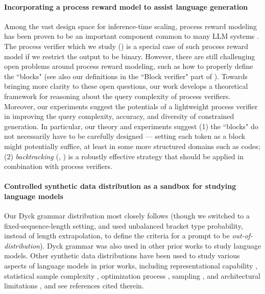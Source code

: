 \paragraph{Incorporating a process reward model to assist language generation}
Among the vast design space for inference-time scaling,
process reward modeling has been proven to be an important component common to many LLM systems
\citep{polu2020generative,uesato2022solving,ma2023let,lightman2023let,wang2024math}.
The process verifier which we study () is a special case of such process reward model if we restrict the output to be binary.
However, there are still challenging open problems around process reward modeling,
such as how to properly define the ``blocks"
\citep{guo2025deepseek}
(see also our definitions in the ``Block verifier" part of ).
Towards bringing more clarity to these open questions,
our work develops a theoretical framework for reasoning about the query complexity of process verifiers.
Moreover, our experiments suggest the potentials of a lightweight process verifier in improving the query complexity, accuracy, and diversity of constrained generation.
In particular, our theory and experiments suggest
(1) the ``blocks" do not necessarily have to be carefully designed --- setting each token as a block might potentially suffice, at least in some more structured domains such as codes;
(2) \emph{backtracking} (, ) is a robustly effective strategy that should be applied in combination with process verifiers.




\paragraph{Controlled synthetic data distribution as a sandbox for studying language models}
Our Dyck grammar distribution most closely follows \citet{wen2023uninterpretability} 
(though we switched to a fixed-sequence-length setting, and used unbalanced bracket type probability, instead of length extrapolation, to define the criteria for a prompt to be \emph{out-of-distribution}).
Dyck grammar was also used in other prior works \citep{hewitt2020rnns, ebrahimi2020self, yao2021self, liu2023same, liu2023Transformers} to study language models.
Other synthetic data distributions have been used to study various aspects of language models in prior works, including
representational capability \citep{bhattamishra2020ability, li2021limitations, zhang2022unveiling, zhao2023Transformers}, 
statistical sample complexity \citep{edelman2022inductive},
optimization process \citep{lu2021on, jelassi2022vision,li2023Transformers,bietti2023birth},
sampling \citep{li2024promises},
and architectural limitations \citep{liu2023exposing},
and see references cited therein.
